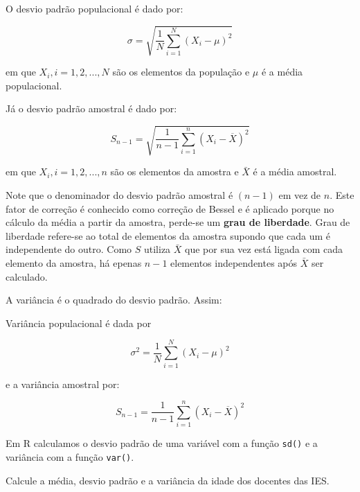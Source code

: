 \documentclass[11pt,]{style/krantz}
\makeatletter
\newenvironment{Shaded}{\begin{snugshade}}{\end{snugshade}}
\newcommand{\DataTypeTok}[1]{\textcolor[rgb]{0.13,0.29,0.53}{#1}}
\newcommand{\KeywordTok}[1]{\textcolor[rgb]{0.13,0.29,0.53}{\textbf{#1}}}
\newcommand{\NormalTok}[1]{#1}
\newcommand{\OperatorTok}[1]{\textcolor[rgb]{0.81,0.36,0.00}{\textbf{#1}}}
\newcommand{\StringTok}[1]{\textcolor[rgb]{0.31,0.60,0.02}{#1}}
\renewenvironment{quote}{\begin{VF}}{\end{VF}}
\newenvironment{kframe}{%
\medskip{}
\setlength{\fboxsep}{.8em}
 \def\at@end@of@kframe{}%
 \ifinner\ifhmode%
  \def\at@end@of@kframe{\end{minipage}}%
  \begin{minipage}{\columnwidth}%
 \fi\fi%
 \def\FrameCommand##1{\hskip\@totalleftmargin \hskip-\fboxsep
 \colorbox{shadecolor}{##1}\hskip-\fboxsep
     \hskip-\linewidth \hskip-\@totalleftmargin \hskip\columnwidth}%
 \MakeFramed {\advance\hsize-\width
   \@totalleftmargin\z@ \linewidth\hsize
   \@setminipage}}%
 {\par\unskip\endMakeFramed%
 \at@end@of@kframe}
\renewenvironment{Shaded}{\begin{kframe}}{\end{kframe}}
\theoremstyle{definition}
\theoremstyle{definition}
\theoremstyle{definition}
\theoremstyle{remark}
\let\BeginKnitrBlock\begin \let\EndKnitrBlock\end
\makeatother
\begin{document}
O desvio padrão populacional é dado por:

\[{\displaystyle \sigma ={\sqrt {{\frac {1}{N}}\sum _{i=1}^{N}(X_{i}-\mu )^{2}}}}\]

em que \(X_i,i=1,2,...,N\) são os elementos da população e \(\mu\) é a média populacional.

Já o desvio padrão amostral é dado por:

\[{\displaystyle S_{n-1}={\sqrt {{\frac {1}{n-1}}\sum _{i=1}^{n}(X_{i}-{\overline {X}})^{2}}}}\]

em que \(X_i,i=1,2,...,n\) são os elementos da amostra e \(\bar X\) é a média amostral.

\begin{quote}
Note que o denominador do desvio padrão amostral é \((n-1)\) em vez de \(n\). Este fator de correção é conhecido como correção de Bessel \citep{reichmann1961use} e é aplicado porque no cálculo da média a partir da amostra, perde-se um \textbf{grau de liberdade}. Grau de liberdade refere-se ao total de elementos da amostra supondo que cada um é independente do outro. Como \(S\) utiliza \(\bar X\) que por sua vez está ligada com cada elemento da amostra, há epenas \(n-1\) elementos independentes após \(\bar X\) ser calculado.
\end{quote}

A variância é o quadrado do desvio padrão. Assim:

Variância populacional é dada por

\[\sigma^2 ={{\frac {1}{N}}\sum _{i=1}^{N}(X_{i}-\mu )^{2}}\]

e a variância amostral por:

\[S_{n-1}={{\frac {1}{n-1}}\sum _{i=1}^{n}(X_{i}-{\overline {X}})^{2}}\]

Em R calculamos o desvio padrão de uma variável com a função \texttt{sd()} e a variância com a função \texttt{var()}.

\BeginKnitrBlock{example}
\protect\hypertarget{exm:unnamed-chunk-62}{}{\label{exm:unnamed-chunk-62} }Calcule a média, desvio padrão e a variância da idade dos docentes das IES.
\EndKnitrBlock{example}

\begin{Shaded}
\end{Shaded}
\end{document}
